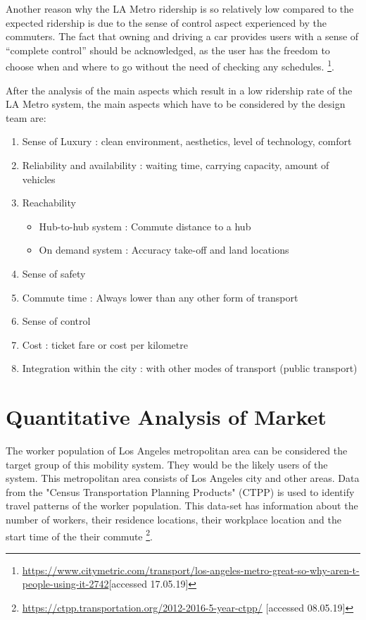 Another reason why the LA Metro ridership is so relatively low compared to the expected ridership is due to the sense of control aspect experienced by the commuters. The fact that owning and driving a car provides users with a sense of “complete control” should be acknowledged, as the user has the freedom to choose when and where to go without the need of checking any schedules. \footnote{\url{https://www.citymetric.com/transport/los-angeles-metro-great-so-why-aren-t-people-using-it-2742}[accessed 17.05.19]}. 

After the analysis of the main aspects which result in a low ridership rate of the LA Metro system, the main aspects which have to be considered by the design team are:


\begin{enumerate}[nolistsep]
    \item Sense of Luxury : clean environment, aesthetics, level of technology, comfort
    \item Reliability and availability : waiting time, carrying capacity, amount of vehicles 
    \item Reachability 
    \begin{itemize}
        \item Hub-to-hub system : Commute distance to a hub  
        \item On demand system : Accuracy take-off and land locations
    \end{itemize}
    \item Sense of safety
    \item Commute time : Always lower than any other form of transport
    \item Sense of control
    \item Cost : ticket fare or cost per kilometre
    \item Integration within the city : with other modes of transport (public transport)
\end{enumerate}


\section{Quantitative Analysis of Market}
\label{quantmarket}
The worker population of Los Angeles metropolitan area can be considered the target group of this mobility system. They would be the likely users of the system. This metropolitan area consists of Los Angeles city and other areas.
Data from the "Census Transportation Planning Products" (CTPP) is used to identify travel patterns of the worker population. This data-set has information about the number of workers, their residence locations, their workplace location and the start time of the their commute \footnote{\url{https://ctpp.transportation.org/2012-2016-5-year-ctpp/} [accessed 08.05.19]}.


